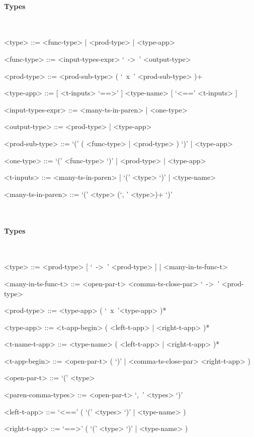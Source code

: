 \documentclass{article}
\begin{document}
\paragraph{Types}

\hspace{1cm}\\
\begin{grammar}

<type> ::= <func-type> | <prod-type> | <type-app>

<func-type> ::= <input-types-expr> `\ ->\ ' <output-type>

<prod-type> ::= <prod-sub-type> ( `\ x\ ' <prod-sub-type> )+

<type-app> ::= [ <t-inputs> `==>' ] <type-name> [ `<==' <t-inputs> ]
 
<input-types-expr> ::= <many-ts-in-paren> | <one-type>

<output-type> ::= <prod-type> | <type-app>

<prod-sub-type> ::= `(' ( <func-type> | <prod-type> ) `)' | <type-app>

<one-type> ::= `(' <func-type> `)' | <prod-type> | <type-app>

<t-inputs> ::= <many-ts-in-paren> | `(' <type> `)' | <type-name>

<many-ts-in-paren> ::=  `(' <type> (`, ' <type>)+ `)'

\end{grammar}


\hspace{1cm}\\
\paragraph{Types}

\hspace{1cm}\\
\begin{grammar}

<type> ::= <prod-type>  [ `\ ->\ ' <prod-type> ] | <many-in-ts-func-t>

<many-in-ts-func-t> ::= <open-par-t> <comma-ts-close-par> `\ ->\ ' <prod-type>

<prod-type> ::= <type-app> ( `\ x\ '<type-app> )*

<type-app> ::= <t-app-begin> ( <left-t-app> | <right-t-app> )*

<t-name-t-app> ::= <type-name> ( <left-t-app> | <right-t-app> )*

<t-app-begin> ::= <open-par-t> ( `)' | <comma-ts-close-par> <right-t-app> ) 

<open-par-t> ::= `(' <type>

<paren-comma-types> ::= <open-par-t> `,\ ' <types> `)'

<left-t-app> ::= `<==' ( `(' <types> `)' | <type-name> )

<right-t-app> ::= `==>' ( `(' <type> `)' | <type-name> )

\end{grammar}



\end{document}

